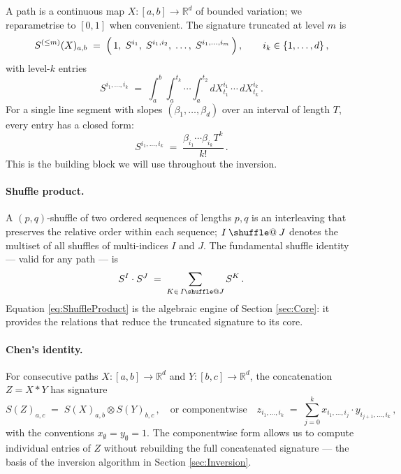 \documentclass[11pt,english]{article}
\makeatletter
\providecommand*{\shuffle}{\mathbin{\mathpalette\shuffle@{}}}
\newcommand*{\shuffle@}[2]{%
  \sbox0{$#1\vcenter{}$}%
  \kern .15\ht0
  \rlap{\vrule height .25\ht0 depth 0pt width 2.5\ht0}%
  \raise.1\ht0\hbox to 2.5\ht0{%
    \vrule height 1.75\ht0 depth -.1\ht0 width .17\ht0
    \hfill
    \vrule height 1.75\ht0 depth -.1\ht0 width .17\ht0
    \hfill
    \vrule height 1.75\ht0 depth -.1\ht0 width .17\ht0}%
  \kern .15\ht0
}
\theoremstyle{definition}
\theoremstyle{remark}
\makeatother
\begin{document}
A path is a continuous map $X:[a,b]\to\mathbb{R}^{d}$ of bounded variation;
we reparametrise to $[0,1]$ when convenient. The signature truncated
at level $m$ is
\begin{equation}
S^{(\leq m)}(X)_{a,b}\;=\;\Bigl(\,1,\;S^{i_{1}},\;S^{i_{1},i_{2}},\;\ldots,\;S^{i_{1},\ldots,i_{m}}\,\Bigr)\,,\qquad i_{k}\in\{1,\ldots,d\}\,,
\end{equation}
with level-$k$ entries
\begin{equation}
S^{i_{1},\ldots,i_{k}}\;=\;\int_{a}^{b}\int_{a}^{t_{k}}\cdots\int_{a}^{t_{2}}dX_{t_{1}}^{i_{1}}\,\cdots\,dX_{t_{k}}^{i_{k}}\,.\label{eq:IteratedIntegral}
\end{equation}
For a single line segment with slopes $(\beta_{1},\ldots,\beta_{d})$
over an interval of length $T$, every entry has a closed form:
\begin{equation}
S^{i_{1},\ldots,i_{k}}\;=\;\frac{\beta_{i_{1}}\cdots\beta_{i_{k}}T^{k}}{k!}\,.\label{eq:LineSignature}
\end{equation}
This is the building block we will use throughout the inversion.

\paragraph{Shuffle product.}
A $(p,q)$-shuffle of two ordered sequences of lengths $p,q$ is an
interleaving that preserves the relative order within each sequence;
$I\shuffle J$ denotes the multiset of all shuffles of multi-indices
$I$ and $J$. The fundamental shuffle identity --- valid for any
path --- is
\begin{equation}
S^{I}\cdot S^{J}\;=\;\sum_{K\in\,I\shuffle J}S^{K}\,.\label{eq:ShuffleProduct}
\end{equation}
Equation \eqref{eq:ShuffleProduct} is the algebraic engine of Section
\ref{sec:Core}: it provides the relations that reduce the truncated
signature to its core.

\paragraph{Chen's identity.}
For consecutive paths $X:[a,b]\to\mathbb{R}^{d}$ and $Y:[b,c]\to\mathbb{R}^{d}$,
the concatenation $Z=X*Y$ has signature
\begin{equation}
S(Z)_{a,c}\;=\;S(X)_{a,b}\otimes S(Y)_{b,c}\,,\quad\text{or componentwise}\quad z_{i_{1},\ldots,i_{k}}\;=\;\sum_{j=0}^{k}x_{i_{1},\ldots,i_{j}}\cdot y_{i_{j+1},\ldots,i_{k}}\,,\label{eq:ChenIndex}
\end{equation}
with the conventions $x_{\emptyset}=y_{\emptyset}=1$. The componentwise
form allows us to compute individual entries of $Z$ without rebuilding
the full concatenated signature --- the basis of the inversion algorithm
in Section \ref{sec:Inversion}.
\end{document}
